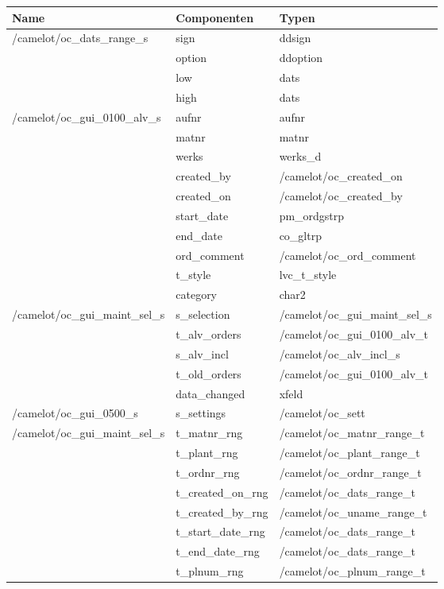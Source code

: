 \begin{longtabu}{p{0.33\textwidth}p{0.3\textwidth}p{0.3\textwidth }}
	\rowfont{\bfseries\leavevmode\color{headingfont}}\textbf{Name} & \textbf{Componenten} & \textbf{Typen} \\ \hline
	/camelot/oc\_dats\_range\_s & sign & ddsign \\
	& option & ddoption \\
	& low & dats \\ 
	& high & dats \\ \hline
	/camelot/oc\_gui\_0100\_alv\_s & aufnr & aufnr \\
	& matnr & matnr \\
	& werks & werks\_d \\
	& created\_by & /camelot/oc\_created\_on \\
	& created\_on & /camelot/oc\_created\_by \\ 
	& start\_date & pm\_ordgstrp \\
	& end\_date & co\_gltrp \\
	& ord\_comment & /camelot/oc\_ord\_comment \\
	& t\_style & lvc\_t\_style \\
	& category & char2 \\ \hline
	/camelot/oc\_gui\_maint\_sel\_s  & s\_selection & /camelot/oc\_gui\_maint\_sel\_s \\
	& t\_alv\_orders & /camelot/oc\_gui\_0100\_alv\_t \\
	& s\_alv\_incl & /camelot/oc\_alv\_incl\_s \\
	& t\_old\_orders & /camelot/oc\_gui\_0100\_alv\_t \\
	& data\_changed & xfeld \\ \hline
	/camelot/oc\_gui\_0500\_s & s\_settings & /camelot/oc\_sett \\ \hline
	/camelot/oc\_gui\_maint\_sel\_s & t\_matnr\_rng & /camelot/oc\_matnr\_range\_t \\
	& t\_plant\_rng & /camelot/oc\_plant\_range\_t \\
	& t\_ordnr\_rng & /camelot/oc\_ordnr\_range\_t \\
	& t\_created\_on\_rng & /camelot/oc\_dats\_range\_t \\
	& t\_created\_by\_rng & /camelot/oc\_uname\_range\_t \\
	& t\_start\_date\_rng & /camelot/oc\_dats\_range\_t \\
	& t\_end\_date\_rng & /camelot/oc\_dats\_range\_t \\
	& t\_plnum\_rng & /camelot/oc\_plnum\_range\_t \\

\end{longtabu}
